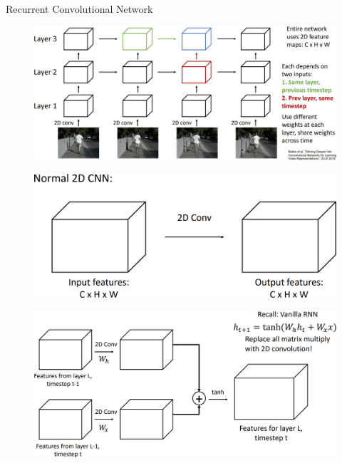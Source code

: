 \begin{frame}[allowframebreaks]{Recurrent Convolutional Network}
    \begin{figure}
        \centering
        \includegraphics[width=1\textwidth,height=0.9\textheight,keepaspectratio]{images/video/slide_28_1_img.jpg}
    \end{figure}
\framebreak
    \begin{figure}
        \centering
        \includegraphics[width=1\textwidth,height=0.9\textheight,keepaspectratio]{images/video/slide_29_1_img.png}
    \end{figure}
\framebreak
    \begin{figure}
        \centering
        \includegraphics[width=1\textwidth,height=0.9\textheight,keepaspectratio]{images/video/slide_30_1_img.jpg}
    \end{figure}
\end{frame}

